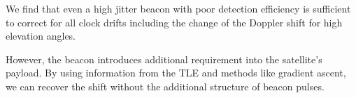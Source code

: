 We find that even a high jitter beacon with poor detection efficiency is sufficient to correct for all clock drifts including the change of the Doppler shift for high elevation angles.

However, the beacon introduces additional requirement into the satellite's payload. By using information from the TLE and methods like gradient ascent, we can recover the shift without the additional structure of beacon pulses.

